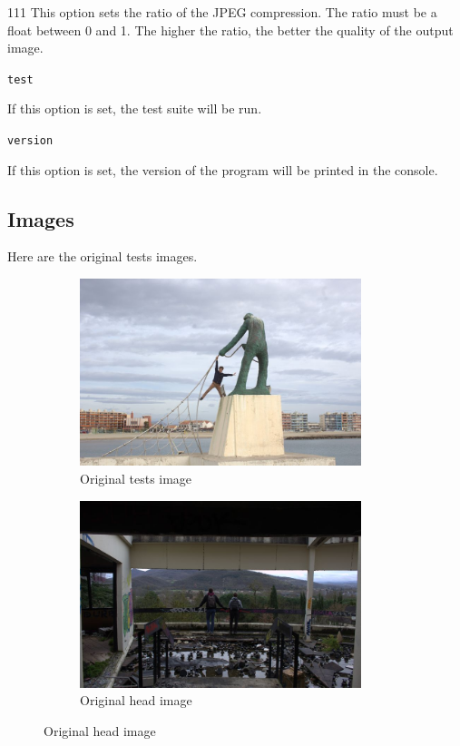 \begin{dinglist}{111}
    This option sets the ratio of the JPEG compression. The ratio must be a float between 0 and 1. The higher the ratio, the better the quality of the output image.

    \item \texttt{test}

    If this option is set, the test suite will be run.

    \item \texttt{version}

    If this option is set, the version of the program will be printed in the console.

\end{dinglist}

\subsection{Images}

Here are the original tests images.

\begin{figure}[H]
    \centering
    \begin{subfigure}[b]{0.4\textwidth}
        \centering
        \includegraphics[width=0.9\textwidth]{src/assets/tests/tests_original.jpg}
        \caption{Original tests image}
        \label{fig:original-tests}
    \end{subfigure}
    \begin{subfigure}[b]{0.4\textwidth}
        \centering
        \includegraphics[width=0.9\textwidth]{src/assets/head/head_original.jpg}
        \caption{Original head image}
        \label{fig:original-head}
    \end{subfigure}
\end{figure}
